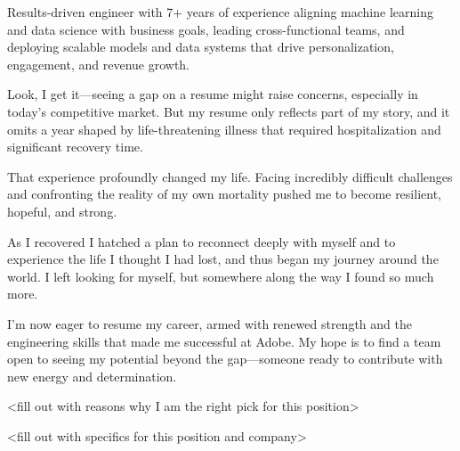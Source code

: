 \makelettertitle

\begin{cvletter}

Results-driven engineer with 7+ years of experience aligning machine learning and data science with business goals, leading cross-functional teams, and deploying scalable models and data systems that drive personalization, engagement, and revenue growth.

% 

Look, I get it—seeing a gap on a resume might raise concerns, especially in today's competitive market. But my resume only reflects part of my story, and it omits a year shaped by life-threatening illness that required hospitalization and significant recovery time.

That experience profoundly changed my life. Facing incredibly difficult challenges and confronting the reality of my own mortality pushed me to become resilient, hopeful, and strong.

As I recovered I hatched a plan to reconnect deeply with myself and to experience the life I thought I had lost, and thus began my journey around the world. I left looking for myself, but somewhere along the way I found so much more.

I'm now eager to resume my career, armed with renewed strength and the engineering skills that made me successful at Adobe. My hope is to find a team open to seeing my potential beyond the gap—someone ready to contribute with new energy and determination.

<fill out with reasons why I am the right pick for this position>

<fill out with specifics for this position and company>

\end{cvletter}


\makeletterclosing


